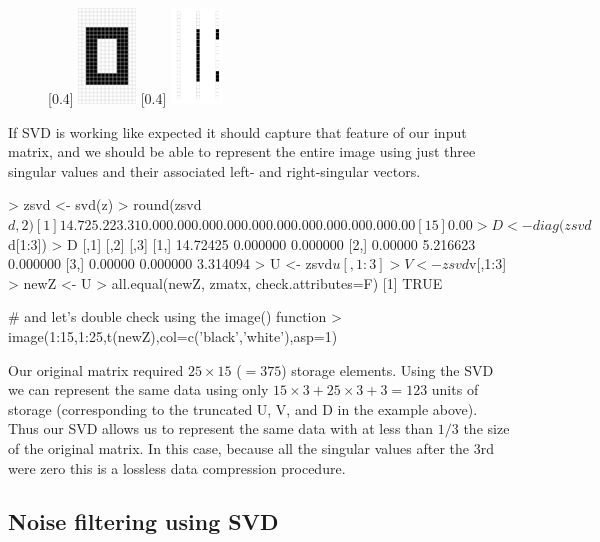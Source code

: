 \begin{figure}[ht!]
\begin{center}
[0.4\linewidth]{%
\includegraphics[height=1in]{./figures/hands-on6/zero.jpg}%
}
[0.4\linewidth]{%
\includegraphics[height=1in]{./figures/hands-on6/zero-vecs.jpg}%
}
\end{center}
\end{figure}

If SVD is working like expected it should capture that feature of our input matrix, and we should be able to represent the entire image using just three singular values and their associated left- and right-singular vectors.

\begin{R}
> zsvd <- svd(z)
> round(zsvd$d,2)
 [1] 14.72  5.22  3.31  0.00  0.00  0.00  0.00  0.00  0.00  0.00  0.00  0.00  0.00  0.00
[15]  0.00
> D <- diag(zsvd$d[1:3])
> D
         [,1]     [,2]     [,3]
[1,] 14.72425 0.000000 0.000000
[2,]  0.00000 5.216623 0.000000
[3,]  0.00000 0.000000 3.314094
> U <- zsvd$u[,1:3]
> V <- zsvd$v[,1:3]
> newZ <- U %
> all.equal(newZ, zmatx, check.attributes=F)
[1] TRUE

# and let's double check using the image() function
> image(1:15,1:25,t(newZ),col=c('black','white'),asp=1)
\end{R}

Our original matrix required $25 \times 15$ ($= 375$) storage elements. Using the SVD we can represent the same data using only $15 \times 3 + 25 \times 3 + 3 = 123$ units of storage (corresponding to the truncated U, V, and D in the example above). Thus our SVD allows us to represent the same data with at less than $1/3$ the size of the original matrix. In this case, because all the singular values after the 3rd were zero this is a lossless data compression procedure.


\subsection{Noise filtering using SVD}

